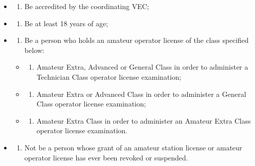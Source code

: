 \documentclass[
  letterpaper,
  DIV=11,
  numbers=noendperiod]{scrreport}
\providecommand{\tightlist}{%
  \setlength{\itemsep}{0pt}\setlength{\parskip}{0pt}}\usepackage{longtable,booktabs,array}
\begin{document}
\begin{itemize}
\item
  \begin{enumerate}
  \def\labelenumi{(\arabic{enumi})}
  \tightlist
  \item
    Be accredited by the coordinating VEC;
  \end{enumerate}
\item
  \begin{enumerate}
  \def\labelenumi{(\arabic{enumi})}
  \setcounter{enumi}{1}
  \tightlist
  \item
    Be at least 18 years of age;
  \end{enumerate}
\item
  \begin{enumerate}
  \def\labelenumi{(\arabic{enumi})}
  \setcounter{enumi}{2}
  \tightlist
  \item
    Be a person who holds an amateur operator license of the class
    specified below:
  \end{enumerate}

  \begin{itemize}
  \item
    \begin{enumerate}
    \def\labelenumi{(\roman{enumi})}
    \tightlist
    \item
      Amateur Extra, Advanced or General Class in order to administer a
      Technician Class operator license examination;
    \end{enumerate}
  \item
    \begin{enumerate}
    \def\labelenumi{(\roman{enumi})}
    \setcounter{enumi}{1}
    \tightlist
    \item
      Amateur Extra or Advanced Class in order to administer a General
      Class operator license examination;
    \end{enumerate}
  \item
    \begin{enumerate}
    \def\labelenumi{(\roman{enumi})}
    \setcounter{enumi}{2}
    \tightlist
    \item
      Amateur Extra Class in order to administer an Amateur Extra Class
      operator license examination.
    \end{enumerate}
  \end{itemize}
\item
  \begin{enumerate}
  \def\labelenumi{(\arabic{enumi})}
  \setcounter{enumi}{3}
  \tightlist
  \item
    Not be a person whose grant of an amateur station license or amateur
    operator license has ever been revoked or suspended.
  \end{enumerate}
\end{itemize}
\end{document}

